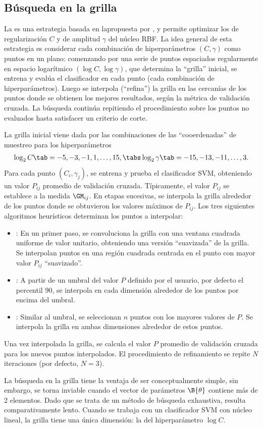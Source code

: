 %
%
\subsection{Búsqueda en la grilla}
%
La  es una estrategia basada en lapropuesta por
\cite{hsu}, y permite optimizar los  de regularización $C$
y de amplitud $\gamma$ del núcleo RBF.
La idea general de esta estrategia es considerar cada combinación de
hiperparámetros $(C,\gamma)$ como puntos en un plano:
comenzando por una serie de puntos espaciados regularmente en espacio
logarítmico $(\log C,\log\gamma)$, que determina la ``grilla''
inicial, se entrena y evalúa el clasificador en cada punto (cada
combinación de hiperparámetros).
Luego se interpola (``refina'') la grilla en las cercanías de los
puntos donde se obtienen los mejores resultados, según la métrica \GM
de validación cruzada.
La búsqueda continúa repitiendo el procedimiento sobre los puntos no
evaluados hasta satisfacer un criterio de corte.

La grilla inicial viene dada por las combinaciones de las
``cooerdenadas'' de muestreo para los hiperparámetros
%
\begin{align}
  \label{initial-grid}
  \log_2 C     \tab= -5, -3, -1, 1, \ldots, 15, \tabs
  \log_2\gamma \tab= -15,-13, -11, \ldots, 3.
\end{align}
%
Para cada punto $(C_i,\gamma_j)$, se entrena y prueba el clasificador
SVM, obteniendo un valor $P_{ij}$ promedio de validación cruzada.
Típicamente, el valor $P_{ij}$ se establece a la medida $\GM_{ij}$.
En etapas sucesivas, se interpola la grilla alrededor de los puntos
donde se obtuvieron los valores máximos de $P_{ij}$.
Los tres siguientes algoritmos heurísticos determinan los puntos a
interpolar:
%
\begin{itemize}
\item
  : En un primer paso, se convoluciona la grilla con una
  ventana cuadrada uniforme de valor unitario, obteniendo una versión
  ``suavizada'' de la grilla.
  Se interpolan puntos en una región cuadrada centrada en el punto con
  mayor valor $P_{ij}$ ``suavizado''.
\item
  : A partir de un umbral del valor $P$ definido por el
  usuario, por defecto el percentil 90, se interpola en cada dimensión
  alrededor de los puntos por encima del umbral.
\item
  : Similar al umbral, se seleccionan $n$ puntos
  con los mayores valores de $P$.
  Se interpola la grilla en ambas dimensiones alrededor de estos
  puntos.
\end{itemize}
%
Una vez interpolada la grilla, se calcula el valor $P$ promedio de
validación cruzada para los nuevos puntos interpolados.
El procedimiento de refinamiento se repite $N$ iteraciones (por
defecto, $N=3$).

La búsqueda en la grilla tiene la ventaja de ser conceptualmente
simple, sin embargo, se torna inviable cuando el vector de parámetros
$\B{\theta}$ contiene más de 2 elementos.
Dado que se trata de un método de búsqueda exhaustiva, resulta
comparativamente lento.
Cuando se trabaja con un clasificador SVM con núcleo lineal, la grilla
tiene una única dimensión: la del hiperparámetro $\log C$.
